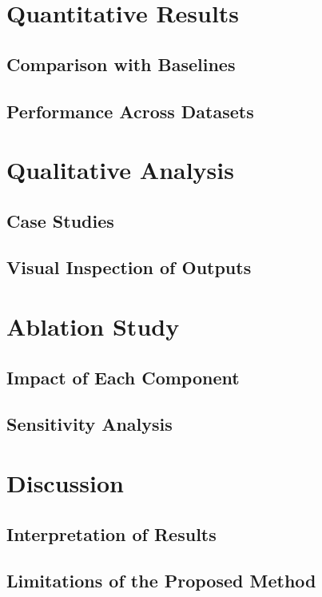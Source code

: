 \section{Quantitative Results}
\label{sec:quantitative-results}

    \subsection{Comparison with Baselines}
    \label{subsec:baseline-comparison}

    \subsection{Performance Across Datasets}
    \label{subsec:dataset-performance}

\section{Qualitative Analysis}
\label{sec:qualitative-analysis}

    \subsection{Case Studies}
    \label{subsec:case-studies}

    \subsection{Visual Inspection of Outputs}
    \label{subsec:visual-inspection}

\section{Ablation Study}
\label{sec:ablation}

    \subsection{Impact of Each Component}
    \label{subsec:component-impact}

    \subsection{Sensitivity Analysis}
    \label{subsec:sensitivity}

\section{Discussion}
\label{sec:discussion}

    \subsection{Interpretation of Results}
    \label{subsec:interpretation}

    \subsection{Limitations of the Proposed Method}
    \label{subsec:limitations}